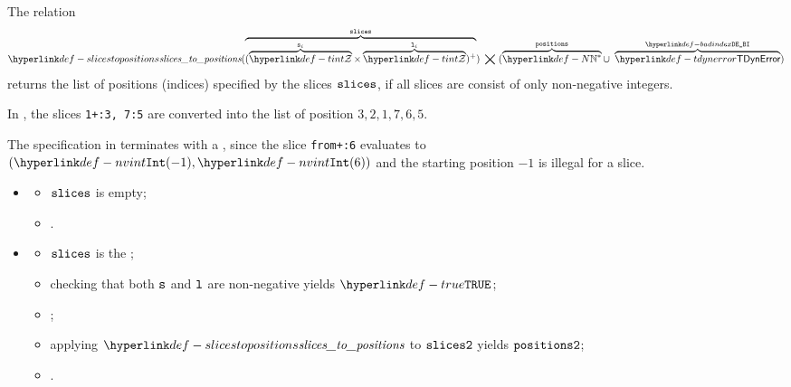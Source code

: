 \hypertarget{def-slicestopositions}{}
The relation
\[
  \slicestopositions(\overname{(\overname{\tint}{\vs_i}\times\overname{\tint}{\vl_i})^+}{\slices}) \;\aslrel\;
  (\overname{\N^*}{\positions} \cup\ \overname{\TDynError}{\BadIndex})
\]
returns the list of positions (indices) specified by the slices $\texttt{slices}$,
if all slices are consist of only non-negative integers.
\ProseOtherwiseDynamicError

In , the slices \verb|1+:3, 7:5|
are converted into the list of position $3, 2, 1, 7, 6, 5$.

The specification in  terminates with a \dynamicerrorterm,
since the slice \verb|from+:6| evaluates to $(\nvint(-1), \nvint(6))$ and the starting position $-1$
is illegal for a slice.


\ProseParagraph
\OneApplies
\begin{itemize}
  \item {}
  \begin{itemize}
    \item $\texttt{slices}$ is empty;
    \item {}.
  \end{itemize}

  \item {}
  \begin{itemize}
    \item $\texttt{slices}$ is the ;
    \item checking that both $\texttt{s}$ and $\texttt{l}$ are non-negative yields $\True$\ProseTerminateAs{\BadIndex};
    \item {};
    \item applying $\slicestopositions$ to $\texttt{slices2}$ yields $\texttt{positions2}$\ProseOrError;
    \item {}.
  \end{itemize}
\end{itemize}

